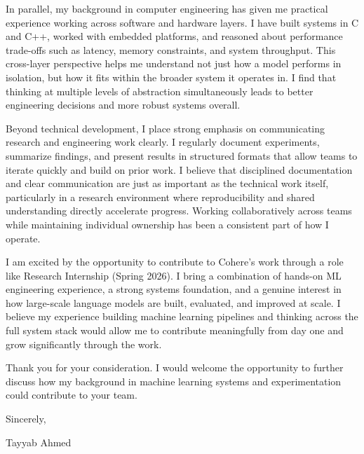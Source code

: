 \documentclass[11pt]{letter}
\begin{document}
In parallel, my background in computer engineering has given me practical experience working across software and hardware layers. I have built systems in C and C++, worked with embedded platforms, and reasoned about performance trade-offs such as latency, memory constraints, and system throughput. This cross-layer perspective helps me understand not just how a model performs in isolation, but how it fits within the broader system it operates in. I find that thinking at multiple levels of abstraction simultaneously leads to better engineering decisions and more robust systems overall.

Beyond technical development, I place strong emphasis on communicating research and engineering work clearly. I regularly document experiments, summarize findings, and present results in structured formats that allow teams to iterate quickly and build on prior work. I believe that disciplined documentation and clear communication are just as important as the technical work itself, particularly in a research environment where reproducibility and shared understanding directly accelerate progress. Working collaboratively across teams while maintaining individual ownership has been a consistent part of how I operate.

I am excited by the opportunity to contribute to Cohere's work through a role like Research Internship (Spring 2026). I bring a combination of hands-on ML engineering experience, a strong systems foundation, and a genuine interest in how large-scale language models are built, evaluated, and improved at scale. I believe my experience building machine learning pipelines and thinking across the full system stack would allow me to contribute meaningfully from day one and grow significantly through the work.

Thank you for your consideration. I would welcome the opportunity to further discuss how my background in machine learning systems and experimentation could contribute to your team.

\vspace{0.9em}

Sincerely,

\vspace{0.1em}

Tayyab Ahmed
\end{document}
